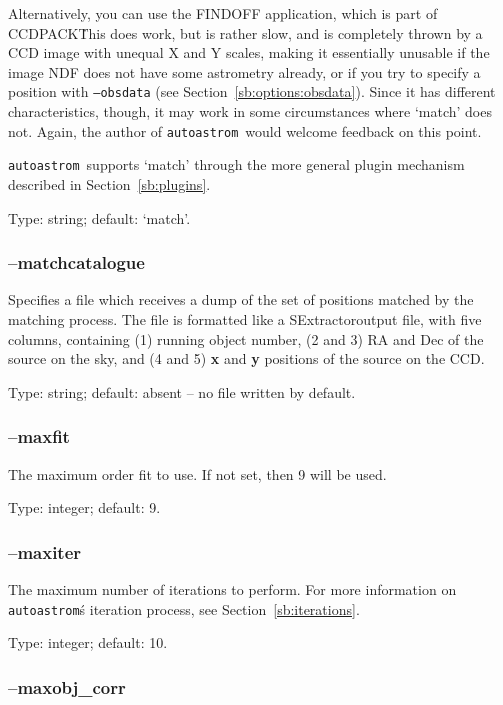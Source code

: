 \documentclass[twoside,11pt]{article}
\newcommand{\xref}[3]{#1}
\newcommand{\xlabel}[1]{}
\newcommand{\autoastrom}{\texttt{autoastrom}}
\newcommand{\CCDPACKref}{\xref{{\footnotesize CCDPACK}}{sun139}{}}
\newcommand{\SExtractor}{\xref{{\footnotesize SExtractor}}{sun226}}
\begin{document}
Alternatively, you can use the FINDOFF application, which is part of
\CCDPACKref\.  This does work, but is rather slow, and is completely thrown by
a CCD image with unequal X and Y scales, making it essentially unusable if the
image NDF does not have some astrometry already, or if you try to specify a
position with \texttt{--obsdata} (see Section~\ref{sb:options:obsdata}).
Since it has different characteristics, though, it may work in some
circumstances where `match' does not.  Again, the author of \autoastrom\ would
welcome feedback on this point.

\autoastrom\ supports `match' through the more general plugin mechanism
described in Section~\ref{sb:plugins}.

Type: string; default: `match'.

\subsubsection{\xlabel{sb_options_matchcatalogue}--matchcatalogue\label{sb:options:matchcatalogue}}

Specifies a file which receives a dump of the set of positions matched by the
matching process.  The file is formatted like a \SExtractor\ output file, with
five columns, containing (1) running object number, (2 and 3) RA and Dec of
the source on the sky, and (4 and 5) \textbf{x} and \textbf{y} positions of
the source on the CCD.

Type: string; default: absent -- no file written by default.

\subsubsection{\xlabel{sb_options_maxfig}--maxfit\label{sb:options:maxfit}}

The maximum order fit to use. If not set, then 9 will be used.

Type: integer; default: 9.

\subsubsection{\xlabel{sb_options_maxiter}--maxiter\label{sb:options:maxiter}}

The maximum number of iterations to perform. For more information on
\autoastrom\'s iteration process, see Section~\ref{sb:iterations}.

Type: integer; default: 10.

\subsubsection{\xlabel{sb_options_maxobj_corr}--maxobj\_corr\label{sb:options:maxobj_corr}}
\end{document}
